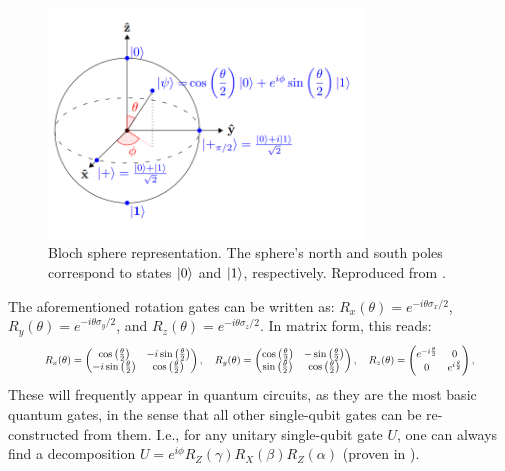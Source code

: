 \begin{figure}[H]
    \centering
    \includegraphics[width=0.75\textwidth]{Figures/Diagrams/Bloch_sphere.png}
    \caption{Bloch sphere representation. The sphere's north  and south poles correspond to states $\ket{0}$ and $\ket{1}$, respectively. Reproduced from \cite{Bloch_Sphere_Ref}.}
    \label{fig:Bloch_sphere}
\end{figure}
\noindent The aforementioned rotation gates can be written as: $R_x(\theta) = e^{-i\theta\sigma_x/2}$, $R_y(\theta) = e^{-i\theta\sigma_y/2}$, and $R_z(\theta) = e^{-i\theta\sigma_z/2}$. In matrix form, this reads:
\begin{equation}
  \resizebox{0.90\hsize}{!}
  {$
  R_x(\theta) =
  \begin{pmatrix}
    \cos\left(\frac{\theta}{2}\right) & -i\sin\left(\frac{\theta}{2}\right) \\
    -i\sin\left(\frac{\theta}{2}\right) & \cos\left(\frac{\theta}{2}\right)
  \end{pmatrix},
  \quad
  R_y(\theta) =
  \begin{pmatrix}
    \cos\left(\frac{\theta}{2}\right) & -\sin\left(\frac{\theta}{2}\right) \\
    \sin\left(\frac{\theta}{2}\right) & \cos\left(\frac{\theta}{2}\right)
  \end{pmatrix},
  \quad
  R_z(\theta) =
  \begin{pmatrix}
    e^{-i\frac{\theta}{2}} & 0 \\
    0 & e^{i\frac{\theta}{2}}
  \end{pmatrix},
  $}
\end{equation}
These will frequently appear in quantum circuits, as they are the most basic quantum gates, in the sense that all other single-qubit gates can be re-constructed from them. I.e., for any unitary single-qubit gate $U$, one can always find a decomposition $U=e^{i\phi}R_{Z}(\gamma)R_{X}(\beta)R_{Z}(\alpha)$ (proven in \cite{Barenco_1995}).

